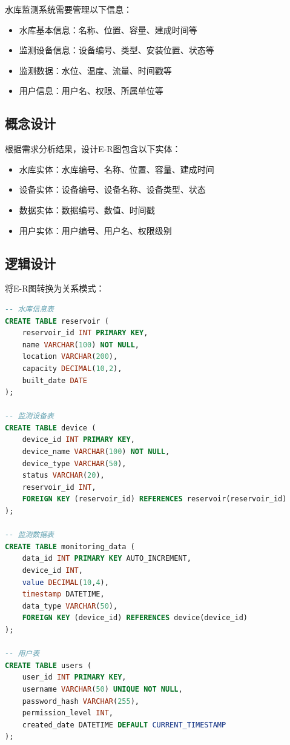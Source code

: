 水库监测系统需要管理以下信息：
\begin{itemize}
    \item 水库基本信息：名称、位置、容量、建成时间等
    \item 监测设备信息：设备编号、类型、安装位置、状态等
    \item 监测数据：水位、温度、流量、时间戳等
    \item 用户信息：用户名、权限、所属单位等
\end{itemize}

\subsection{概念设计}

根据需求分析结果，设计E-R图包含以下实体：
\begin{itemize}
    \item 水库实体：水库编号、名称、位置、容量、建成时间
    \item 设备实体：设备编号、设备名称、设备类型、状态
    \item 数据实体：数据编号、数值、时间戳
    \item 用户实体：用户编号、用户名、权限级别
\end{itemize}

\subsection{逻辑设计}

将E-R图转换为关系模式：

\begin{lstlisting}[language=SQL, caption=水库监测系统数据表结构]
-- 水库信息表
CREATE TABLE reservoir (
    reservoir_id INT PRIMARY KEY,
    name VARCHAR(100) NOT NULL,
    location VARCHAR(200),
    capacity DECIMAL(10,2),
    built_date DATE
);

-- 监测设备表
CREATE TABLE device (
    device_id INT PRIMARY KEY,
    device_name VARCHAR(100) NOT NULL,
    device_type VARCHAR(50),
    status VARCHAR(20),
    reservoir_id INT,
    FOREIGN KEY (reservoir_id) REFERENCES reservoir(reservoir_id)
);

-- 监测数据表
CREATE TABLE monitoring_data (
    data_id INT PRIMARY KEY AUTO_INCREMENT,
    device_id INT,
    value DECIMAL(10,4),
    timestamp DATETIME,
    data_type VARCHAR(50),
    FOREIGN KEY (device_id) REFERENCES device(device_id)
);

-- 用户表
CREATE TABLE users (
    user_id INT PRIMARY KEY,
    username VARCHAR(50) UNIQUE NOT NULL,
    password_hash VARCHAR(255),
    permission_level INT,
    created_date DATETIME DEFAULT CURRENT_TIMESTAMP
);
\end{lstlisting}

